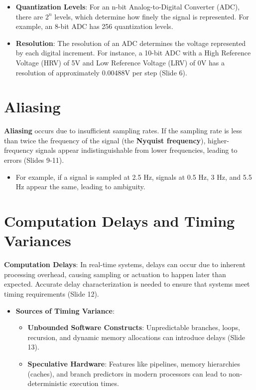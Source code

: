 \documentclass[
  14pt,
  a4paper,
  numbers=noendperiod,
  headinclude=true,
  footinclude=true,
  DIV=calc]{scrreprt}
\providecommand{\tightlist}{%
  \setlength{\itemsep}{0pt}\setlength{\parskip}{0pt}}\usepackage{longtable,booktabs,array}
\begin{document}
\begin{itemize}
\item
  \textbf{Quantization Levels}: For an n-bit Analog-to-Digital Converter
  (ADC), there are \(2^n\) levels, which determine how finely the signal
  is represented. For example, an 8-bit ADC has 256 quantization levels.
\item
  \textbf{Resolution}: The resolution of an ADC determines the voltage
  represented by each digital increment. For instance, a 10-bit ADC with
  a High Reference Voltage (HRV) of 5V and Low Reference Voltage (LRV)
  of 0V has a resolution of approximately 0.00488V per step (Slide 6).
\end{itemize}

\section{Aliasing}\label{aliasing}

\textbf{Aliasing} occurs due to insufficient sampling rates. If the
sampling rate is less than twice the frequency of the signal (the
\textbf{Nyquist frequency}), higher-frequency signals appear
indistinguishable from lower frequencies, leading to errors (Slides
9-11).

\begin{itemize}
\tightlist
\item
  For example, if a signal is sampled at 2.5 Hz, signals at 0.5 Hz, 3
  Hz, and 5.5 Hz appear the same, leading to ambiguity.
\end{itemize}

\section{Computation Delays and Timing
Variances}\label{computation-delays-and-timing-variances}

\textbf{Computation Delays}: In real-time systems, delays can occur due
to inherent processing overhead, causing sampling or actuation to happen
later than expected. Accurate delay characterization is needed to ensure
that systems meet timing requirements (Slide 12).

\begin{itemize}
\item
  \textbf{Sources of Timing Variance}:

  \begin{itemize}
  \item
    \textbf{Unbounded Software Constructs}: Unpredictable branches,
    loops, recursion, and dynamic memory allocations can introduce
    delays (Slide 13).
  \item
    \textbf{Speculative Hardware}: Features like pipelines, memory
    hierarchies (caches), and branch predictors in modern processors can
    lead to non-deterministic execution times.
  \end{itemize}
\end{itemize}
\end{document}
